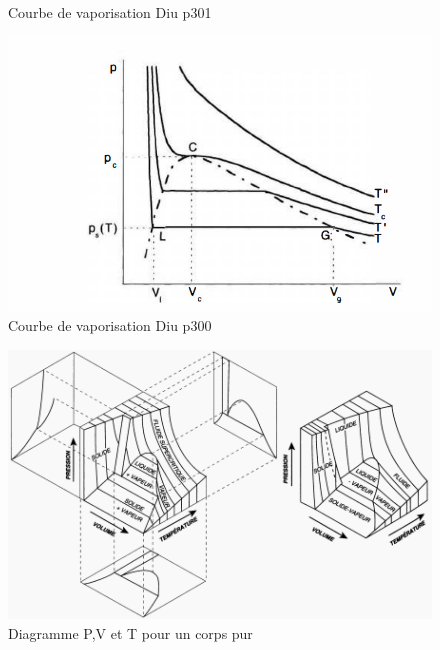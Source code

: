 \documentclass[10pt]{beamer}
\begin{document}
\begin{frame}{\insertsubsection}
\begin{minipage}{.48\linewidth}
\begin{figure}
        \caption{Courbe de vaporisation Diu p301}
    \end{figure}
\end{minipage}
\end{frame}


\begin{frame}{\insertsubsection}
    \begin{minipage}{.48\linewidth}
    \begin{figure}
        \centering
        \includegraphics[width=1\textwidth]{Isotherme_courbe_vaporisation.png}
        \caption{Courbe de vaporisation Diu p300}
    \end{figure}
\end{minipage}
\begin{minipage}{.48\linewidth}
    \begin{figure}
        \centering

        \includegraphics[width=1.2\textwidth]{DiagrammePVT.png}
        \caption{Diagramme P,V et T pour un corps pur}
    \end{figure}
\end{minipage}
\end{frame}
\end{document}

